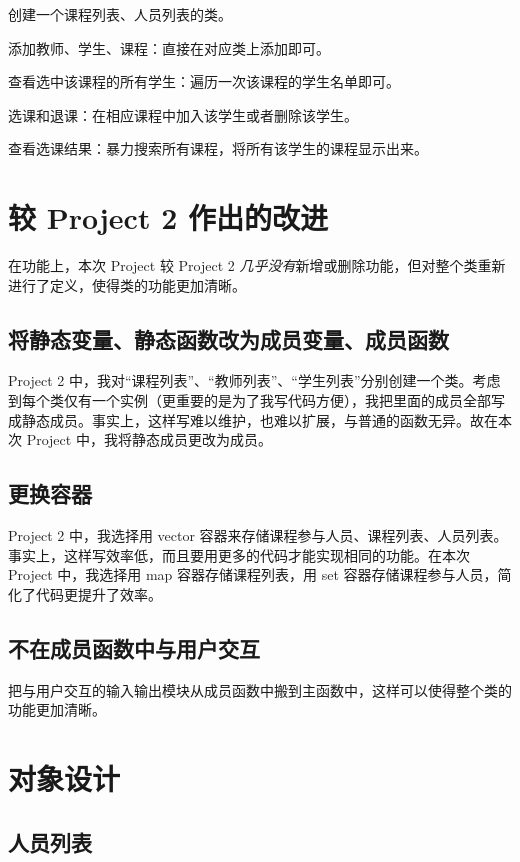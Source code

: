\documentclass{article}
\begin{document}
创建一个课程列表、人员列表的类。

添加教师、学生、课程：直接在对应类上添加即可。

查看选中该课程的所有学生：遍历一次该课程的学生名单即可。

选课和退课：在相应课程中加入该学生或者删除该学生。

查看选课结果：暴力搜索所有课程，将所有该学生的课程显示出来。

\section{较 Project 2 作出的改进}

在功能上，本次 Project 较 Project 2 \emph{几乎没有}新增或删除功能，但对整个类重新进行了定义，使得类的功能更加清晰。

\subsection{将静态变量、静态函数改为成员变量、成员函数}

Project 2 中，我对“课程列表”、“教师列表”、“学生列表”分别创建一个类。考虑到每个类仅有一个实例（更重要的是为了我写代码方便），我把里面的成员全部写成静态成员。事实上，这样写难以维护，也难以扩展，与普通的函数无异。故在本次 Project 中，我将静态成员更改为成员。

\subsection{更换容器}

Project 2 中，我选择用 vector 容器来存储课程参与人员、课程列表、人员列表。事实上，这样写效率低，而且要用更多的代码才能实现相同的功能。在本次 Project 中，我选择用 map 容器存储课程列表，用 set 容器存储课程参与人员，简化了代码更提升了效率。

\subsection{不在成员函数中与用户交互}

把与用户交互的输入输出模块从成员函数中搬到主函数中，这样可以使得整个类的功能更加清晰。

\section{对象设计}

\subsection{人员列表}
\end{document}
